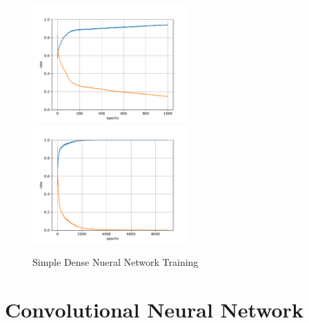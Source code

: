 \documentclass{article}
\begin{document}
\begin{figure}
\begin{center}
\includegraphics[width=6cm]{../dump/model1_01000.pdf}
\includegraphics[width=6cm]{../dump/model1_09000.pdf}
\end{center}
\caption{Simple Dense Nueral Network Training}\label{fig:2}
\end{figure}

\section{Convolutional Neural Network}
\end{document}
